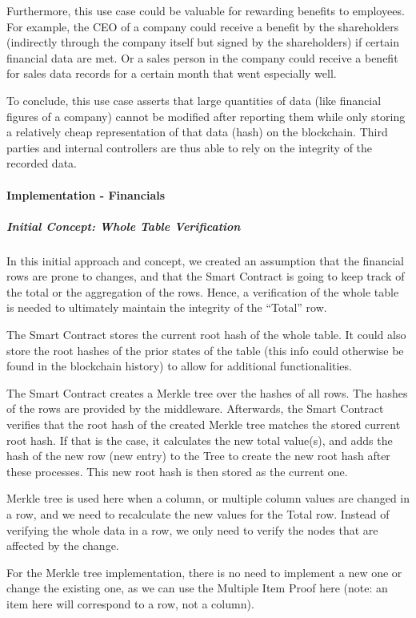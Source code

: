 Furthermore, this use case could be valuable for rewarding benefits to employees. For example, the CEO of a company could receive a benefit by the shareholders (indirectly through the company itself but signed by the shareholders) if certain financial data are met. Or a sales person in the company could receive a benefit for sales data records for a certain month that went especially well. 

To conclude, this use case asserts that large quantities of data (like financial figures of a company) cannot be modified after reporting them while only storing a relatively cheap representation of that data (hash) on the blockchain. Third parties and internal controllers are thus able to rely on the integrity of the recorded data. 

\paragraph{Implementation - Financials}
\subparagraph{Initial Concept: Whole Table Verification}

In this initial approach and concept, we created an assumption that the financial rows are prone to changes, and that the Smart Contract is going to keep track of the total or the aggregation of the rows. Hence, a verification of the whole table is needed to ultimately maintain the integrity of the “Total” row.

The Smart Contract stores the current root hash of the whole table. It could also store the root hashes of the prior states of the table (this info could otherwise be found in the blockchain history) to allow for additional functionalities.

The Smart Contract creates a Merkle tree over the hashes of all rows. The hashes of the rows are provided by the middleware. Afterwards, the Smart Contract verifies that the root hash of the created Merkle tree matches the stored current root hash. If that is the case, it calculates the new total value(s), and adds the hash of the new row (new entry) to the Tree to create the new root hash after these processes. This new root hash is then stored as the current one. 

Merkle tree is used here when a column, or multiple column values are changed in a row, and we need to recalculate the new values for the Total row. Instead of verifying the whole data in a row, we only need to verify the nodes that are affected by the change. 

For the Merkle tree implementation, there is no need to implement a new one or change the existing one, as we can use the Multiple Item Proof here (note: an item here will correspond to a row, not a column).

